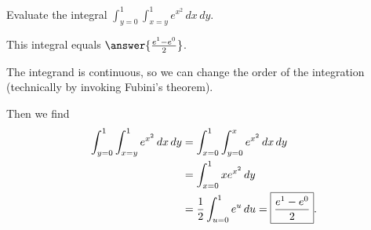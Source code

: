 \documentclass{ximera}
\author{Jim Fowler}
\begin{document}
\begin{exercise}
Evaluate the integral $\displaystyle\int_{y = 0}^1 \int_{x = y}^1 e^{x^2} \, dx \, dy$.

This integral equals $\answer{\frac{e^1 - e^0}{2}}$.

\begin{hint}
  The integrand is continuous, so we can change the order of the integration (technically by invoking Fubini's theorem).
\end{hint}
\begin{hint}Then we find
 \begin{align*}
 \int_{y = 0}^1 \int_{x = y}^1 e^{x^2} \, dx \, dy 
 &= \int_{x = 0}^1 \int_{y = 0}^x e^{x^2} \, dx \, dy \\
 &= \int_{x = 0}^1 x e^{x^2} \, dy \\
 &= \frac{1}{2} \int_{u = 0}^1 e^{u} \, du = \fbox{$\displaystyle\frac{e^1 - e^0}{2}$}.
 \end{align*}
\end{hint}

  
\end{exercise}
\end{document}
